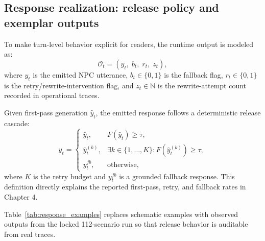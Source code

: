 ﻿\documentclass[a4paper,12pt]{article}
\begin{document}
\subsection{Response realization: release policy and exemplar outputs}
To make turn-level behavior explicit for readers, the runtime output is modeled as:
\begin{equation}
\mathcal{O}_t=\left(y_t,\;b_t,\;r_t,\;z_t\right),
\end{equation}
where \(y_t\) is the emitted NPC utterance, \(b_t\in\{0,1\}\) is the fallback flag, \(r_t\in\{0,1\}\) is the retry/rewrite-intervention flag, and \(z_t\in\mathbb{N}\) is the rewrite-attempt count recorded in operational traces.

Given first-pass generation \(\hat{y}_t\), the emitted response follows a deterministic release cascade:
\begin{equation}
y_t=
\begin{cases}
\hat{y}_t, & F(\hat{y}_t)\ge\tau,\\
\hat{y}^{(k)}_t, & \exists k\in\{1,\dots,K\}:F(\hat{y}^{(k)}_t)\ge\tau,\\
y^{fb}_t, & \text{otherwise},
\end{cases}
\end{equation}
where \(K\) is the retry budget and \(y^{fb}_t\) is a grounded fallback response. This definition directly explains the reported first-pass, retry, and fallback rates in Chapter 4.

Table~\ref{tab:response_examples} replaces schematic examples with observed outputs from the locked 112-scenario run so that release behavior is auditable from real traces.
\end{document}

